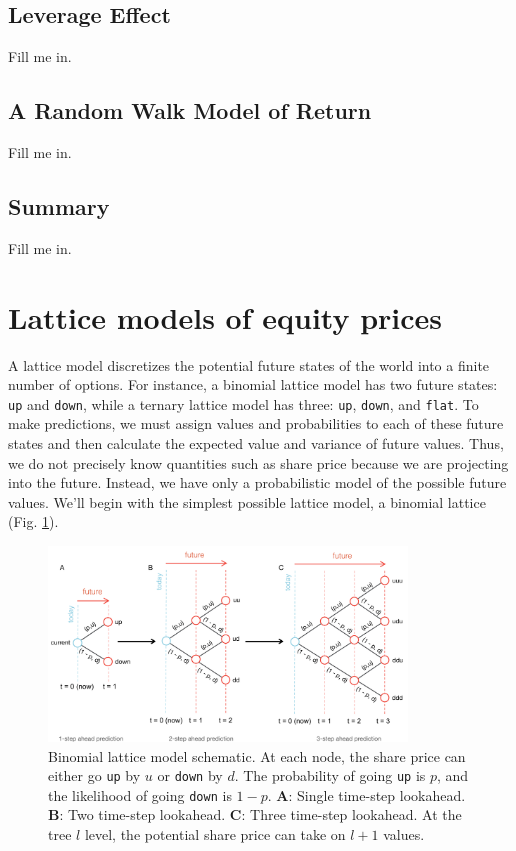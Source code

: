 \documentclass[11pt]{article}
\theoremstyle{definition}
\begin{document}
\subsection{Leverage Effect}\label{sec:leverage-effect}
Fill me in.

\subsection{A Random Walk Model of Return}\label{sec:random-walk-model-of-return}
Fill me in.

\subsection{Summary}\label{sec:summary-stylized-facts}
Fill me in.

\section{Lattice models of equity prices}
A lattice model discretizes the potential future states of the world into a finite number of options. 
For instance, a binomial lattice model has two future states: \texttt{up} and \texttt{down}, while a ternary lattice model has three: \texttt{up}, \texttt{down}, and \texttt{flat}. 
To make predictions, we must assign values and probabilities to each of these future states and then calculate the expected value and variance of future values. 
Thus, we do not precisely know quantities such as share price because we are projecting into the future. Instead, we have only a probabilistic model of the possible future values. 
We'll begin with the simplest possible lattice model, a binomial lattice (Fig. \ref{fig:binomial-lattice-schematic}).
\begin{figure}[h]
    \centering
    \includegraphics[width=0.85\textwidth]{./figs/Fig-Binomial-LatticeModels-Schematic.pdf}
    \caption{Binomial lattice model schematic. 
	At each node, the share price can either go \texttt{up} by $u$ or \texttt{down} by $d$. 
	The probability of going \texttt{up} is $p$, and the likelihood of going \texttt{down} is $1-p$. 
	\textbf{A}: Single time-step lookahead.
	\textbf{B}: Two time-step lookahead.
	\textbf{C}: Three time-step lookahead.
	At the tree $l$ level, the potential share price can take on $l+1$ values.
	}\label{fig:binomial-lattice-schematic}
\end{figure}
\end{document}
